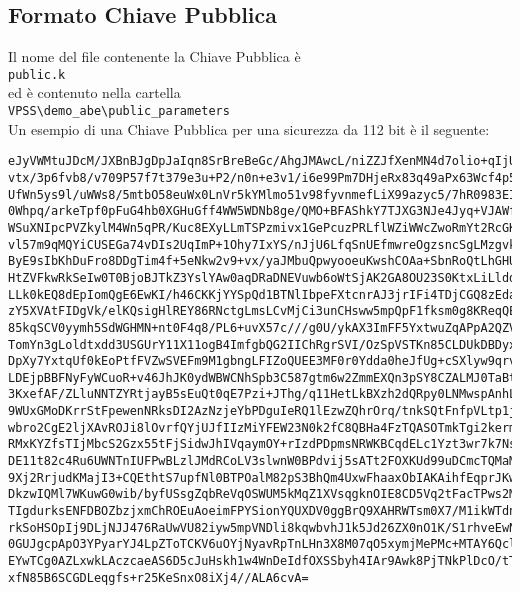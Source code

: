 \documentclass[a4paper,twoside,10pt,openany]{scrbook}
\begin{document}
\subsection{Formato Chiave Pubblica}\label{sec:format_pk}
%
Il nome del file contenente la Chiave Pubblica è \\
\texttt{public.k}\\
ed è contenuto nella cartella\\
\texttt{VPSS\textbackslash demo\_abe\textbackslash public\_parameters}\\
Un esempio di una Chiave Pubblica per una sicurezza da 112 bit è il seguente:
\begin{verbatim}
eJyVWMtuJDcM/JXBnBJgDpJaIqn8SrBreBeGc/AhgJMAwcL/niZZJfXenMN4d7olio+qIjU/7q/1/t
vtx/3p6fvb8/v709P57f7t379e3u+P2/n0n+e3v1/i6e99Pm7DHjeRx83q49aPx63Wcf4p5zfT83N+
UfWn5ys9l/uWWs8/5mtbO58euWx0LnVr5kYMlmo51v98fyvnmefLiX99azyc5/7hR0983EI9HwiP9v
0Whpq/arkeTpf0pFuG4hb0XGHuGff4WW5WDNb8ge/QMO+BFAShkY7TJXG3NJe4Jyq+VJAWf5OONngb
WSuXNIpcPVZkylM4Wn5qPR/Kuc8EXyLLmTSPzmivx1GePcuzPRLflWZiWWcZwoRmYt2RcGKifDLwNi
vl57m9qMQYiCUSEGa74vDIs2UqImP+1Ohy7IxYS/nJjU6LfqSnUEfmwreOgzsncSgLMzgvkyxwXogr
ByE9sIbKhDuFro8DDgTim4f+5eNkw2v9+vx/yaJMbuQpwyooeuKwshCOAa+SbnRoQtLhGHUriS6SyK
HtZVFkwRkSeIw0T0BjoBJTkZ3YslYAw0aqDRaDNEVuwb6oWtSjAK2GA8OU23S0KtxLiLldd3ogcluo
LLk0kEQ8dEpIomQgE6EwKI/h46CKKjYYSpQd1BTNlIbpeFXtcnrAJ3jrIFi4TDjCGQ8zEdaAK8ZwLM
zY5XVAtFIDgVk/elKQsigHlREY86RNctgLmsLCvMjCi3unCHsww5mpQpF1fksm0g8KReqQEKXwFsqS
85kqSCV0yymh5SdWGHMN+nt0F4q8/PL6+uvX57c///g0U/ykAX3ImFF5YxtwuZqAPpA2QZVjtwYPUI
TomYn3gLoldtxdd3USGUrY11X11ogB4ImfgbQG2IIChRgrSVI/OzSpVSTKn85CLDUkDBDyxHmyPQQa
DpXy7YxtqUf0kEoPtfFVZwSVEFm9M1gbngLFIZoQUEE3MF0r0Ydda0heJfUg+cSXlyw9qrvVDaRa2c
LDEjpBBFNyFyWCuoR+v46JhJK0ydWBWCNhSpb3C587gtm6w2ZmmEXQn3pSY8CZALMJ0TaBtEVEIfvZ
3KxefAF/ZLluNNTZYRtjayB5sEuQt0qE7Pzi+JThg/q11HetLkBXzh2dQRpy0LNMwspAnhLhZSVVcl
9WUxGMoDKrrStFpewenNRksDI2AzNzjeYbPDguIeRQ1lEzwZQhrOrq/tnkSQtFnfpVLtp1jkpFH5nZ
wbro2CgE2ljXAvROJi8lOvrfQYjUJfIIzMiYFEW23N0k2fC8QBHa4FzTQASOTmkTgi2kermeFuNYh2
RMxKYZfsTIjMbcS2Gzx55tFjSidwJhIVqaymOY+rIzdPDpmsNRWKBCqdELc1Yzt3wr7k7Nsal9uhUU
DE11t82c4Ru6UWNTnIUFPwBLzlJMdRCoLV3slwnW0BPdvij5sATt2FOXKUd99uDCmcTQMaMHh4pwMF
9Xj2RrjudKMajI3+CQEthtS7upfNl0BTPOalM82pS3BhQm4UxwFhaaxObIAKAihfEqprJKwSLYU3cw
DkzwIQMl7WKuwG0wib/byfUSsgZqbReVqOSWUM5kMqZ1XVsqgknOIE8CD5Vq2tFacTPws2MGR9MTuz
TIgdurksENFDBOZbzjxmChROEuAoeimFPYSionYQUXDV0ggBrQ9XAHRWTsm0X7/M1ikWTdnnizQyk5
rkSoHSOpIj9DLjNJJ476RaUwVU82iyw5mpVNDli8kqwbvhJ1k5Jd26ZX0nO1K/S1rhveEwNwkB+AWv
0GUJgcpApO3YPyarYJ4LpZToTCKV6uOYjNyavRpTnLHn3X8M07qO5xymjMePMc+MTAY6QclT+XQLpl
EYwTCg0AZLxwkLAczcaeAS6D5cJuHskh1w4WnDeIdfOXSSbyh4IAr9Awk8PjTNkPlDcO/tTB09YEFb
xfN85B6SCGDLeqgfs+r25KeSnxO8iXj4//ALA6cvA=
\end{verbatim}
%
\end{document}
